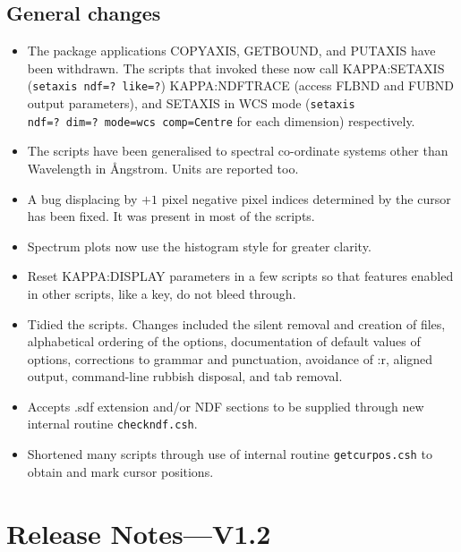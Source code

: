 \documentclass[twoside,11pt]{article}
\newcommand{\xref}[3]{#1}
\renewcommand{\_}{\texttt{\symbol{95}}}
\begin{document}
\subsection{General changes}

\begin{itemize}

\item The package applications COPYAXIS, GETBOUND, and PUTAXIS have
been withdrawn.  The scripts that invoked these now call
\xref{KAPPA:SETAXIS}{sun95}{SETAXIS} ({\tt setaxis ndf=?~like=?})
\xref{KAPPA:NDFTRACE}{sun95}{NDFTRACE} (access FLBND and FUBND output
parameters), and \xref{SETAXIS in WCS mode}{sun95}{SETAXIS}
({\tt setaxis ndf=?~dim=?~mode=wcs comp=Centre} for each dimension)
respectively.

\item The scripts have been generalised to spectral co-ordinate
systems other than Wavelength in {\AA}ngstrom.  Units are reported too.

\item A bug displacing by $+1$ pixel negative pixel indices determined
by the cursor has been fixed.  It was present in most of the scripts.

\item Spectrum plots now use the histogram style for greater clarity.

\item  Reset \xref{KAPPA:DISPLAY}{sun95}{DISPLAY} parameters in a
few scripts so that features enabled in other scripts, like a key,
do not bleed through.

\item Tidied the scripts.  Changes included the silent removal and
creation of files, alphabetical ordering of the options, documentation
of default values of options, corrections to grammar and punctuation,
avoidance of :r, aligned output, command-line rubbish disposal,
and tab removal.

\item Accepts .sdf extension and/or NDF sections to be supplied
through new internal routine {\tt checkndf.csh}.

\item Shortened many scripts through use of internal routine
{\tt getcurpos.csh} to obtain and mark cursor positions.

\end{itemize}


\section{Release Notes---V1.2}
\end{document}
